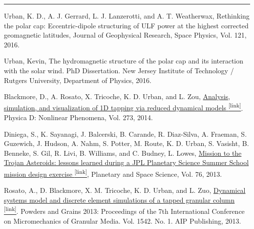 \documentclass[10pt]{article}
\newcommand{\ressection}[1]{\noindent{\large\textbf{#1}}
\vspace{2pt}\hrule\vspace{4pt}}
\begin{document}
\vspace{0.2cm}
\ressection{Peer-Reviewed Papers}
\vspace{-0.8em}
\begin{itemize*}


  \item
    Urban, K. D., A. J. Gerrard, L. J. Lanzerotti, and A. T. Weatherwax, 
    Rethinking the polar cap: Eccentric-dipole structuring of ULF power
    at the highest corrected geomagnetic latitudes, Journal of Geophysical
    Research, Space Physics, Vol. 121, 2016.

  \item
    Urban, Kevin, 
    The hydromagnetic structure of the polar cap and its interaction
    with the solar wind. PhD Dissertation. New Jersey Institute of
    Technology / Rutgers University, Department of Physics, 2016.

  \item \label{itm:gran1}
    Blackmore, D., A. Rosato, X. Tricoche, K. D. Urban, and L. Zou,
    \href{http://www.sciencedirect.com/science/article/pii/S0167278914000189}{ Analysis, 
    simulation, and visualization of 1D tapping via
    reduced dynamical models \textsuperscript{\tiny{[link]}}}. Physica D: Nonlinear Phenomena, Vol.
    273, 2014.

  \item
    Diniega, S., K. Sayanagi, J. Balcerski, B. Carande, R. Diaz-Silva,
    A. Fraeman, S. Guzewich, J. Hudson, A. Nahm, S. Potter, M. Route, K.
    D. Urban, S. Vasisht, B. Benneke, S. Gil, R. Livi, B. Williams, and C.
    Budney, L. Lowes,   
    \href{http://www.sciencedirect.com/science/article/pii/S0032063312003741}{Mission 
    to the Trojan Asteroids: lessons learned
    during a JPL Planetary Science Summer School mission design
    exercise \textsuperscript{\tiny{[link]}}}, Planetary and Space Science, Vol. 76, 2013.

  \item 
    Rosato, A., D. Blackmore, X. M. Tricoche, K. D. Urban, and L. Zuo,
    \href{http://scitation.aip.org/content/aip/proceeding/aipcp/10.1063/1.4811931}{Dynamical
    systems model and discrete element simulations of a tapped granular
    column \textsuperscript{\tiny{[link]}}}. Powders and Grains 2013: Proceedings of
    the 7th International Conference on Micromechanics of Granular
    Media. Vol. 1542. No. 1. AIP Publishing, 2013.


\end{itemize*}
\end{document}
